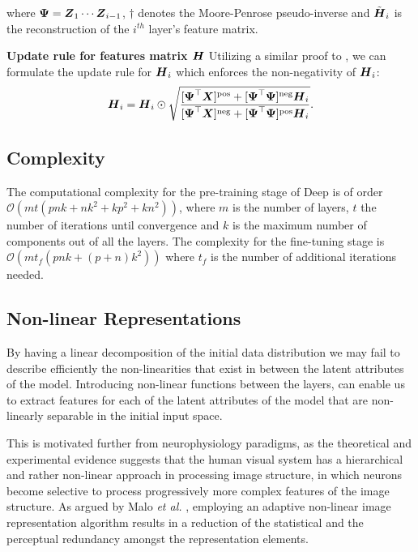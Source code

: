 \documentclass[10pt,journal,compsoc]{IEEEtran}
\begin{document}
where $\boldsymbol{\Psi} = {\boldsymbol{Z}}_1 \cdots {\boldsymbol{Z}}_{i-1}$, $\dagger$ denotes the Moore-Penrose pseudo-inverse and $\tilde{\boldsymbol H}_i$ is the reconstruction of the $i^{th}$ layer's feature matrix.

\textbf{Update rule for features matrix $\boldsymbol H$} Utilizing a similar proof to \cite{ding2010convex}, {} we can formulate the update rule for $\boldsymbol H_i$ which enforces the non-negativity of $\boldsymbol{H}_i$: 
\begin{equation}
  \boldsymbol H_i = \boldsymbol H_i \odot \sqrt{ \dfrac{[\boldsymbol{\Psi}^{\top} \boldsymbol X]^{\text{pos}} + [\boldsymbol{\Psi}^{\top} \boldsymbol{\Psi}]^{\text{neg}} \boldsymbol H_i}{[\boldsymbol{\Psi}^{\top} \boldsymbol X]^{\text{neg}} + [\boldsymbol{\Psi}^{\top} \boldsymbol{\Psi}]^{\text{pos}} \boldsymbol H_i} }.
  \label{eq:H_update_rule}
\end{equation}



\subsection*{Complexity} %
\label{sub:complexity}

The computational complexity for the pre-training stage of Deep \seminmf is of order $\mathcal{O}\left( m t \left( pnk + nk^2 + kp^2 + kn^2 \right) \right)$, where $m$ is the number of
layers, $t$ the number of iterations until convergence and $k$ is the maximum number of components out of all the layers. The complexity for the fine-tuning stage is $\mathcal{O}\left(m t_f \left(
pnk + (p + n)k^2 \right)\right)$ where $t_f$ is the number of additional iterations needed.


\subsection{Non-linear Representations}\label{sub:nonlinear}

By having a linear decomposition of the initial data distribution we may fail to describe efficiently the non-linearities that exist in between the latent attributes of the model. Introducing non-linear functions between the layers, can enable us to extract features for each of the latent attributes of the model that are non-linearly separable in the initial input space. 

This is motivated further from neurophysiology paradigms, as the theoretical and experimental evidence suggests that the human visual system has a hierarchical  and rather non-linear approach \cite{Riesenhuber1999} in processing image structure, in which neurons become selective to process progressively more complex features of the image structure. As argued by Malo {\it et al.} \cite{Malo2006}, employing an adaptive non-linear image representation algorithm results in a reduction of the statistical and the perceptual redundancy amongst the representation elements. 
\end{document}
